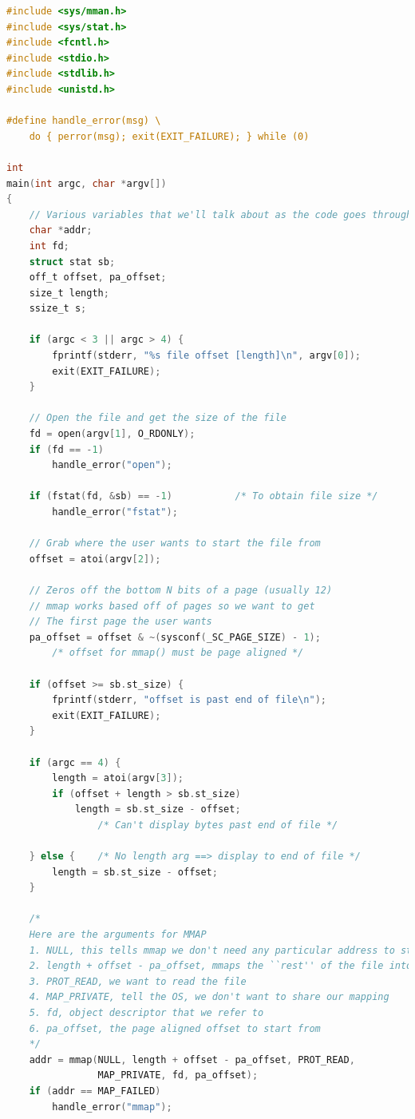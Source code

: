  \begin{lstlisting}[language=C]
#include <sys/mman.h>
#include <sys/stat.h>
#include <fcntl.h>
#include <stdio.h>
#include <stdlib.h>
#include <unistd.h>

#define handle_error(msg) \
    do { perror(msg); exit(EXIT_FAILURE); } while (0)

int
main(int argc, char *argv[])
{
    // Various variables that we'll talk about as the code goes through
    char *addr;
    int fd;
    struct stat sb;
    off_t offset, pa_offset;
    size_t length;
    ssize_t s;

    if (argc < 3 || argc > 4) {
        fprintf(stderr, "%s file offset [length]\n", argv[0]);
        exit(EXIT_FAILURE);
    }

    // Open the file and get the size of the file
    fd = open(argv[1], O_RDONLY);
    if (fd == -1)
        handle_error("open");

    if (fstat(fd, &sb) == -1)           /* To obtain file size */
        handle_error("fstat");

    // Grab where the user wants to start the file from
    offset = atoi(argv[2]);

    // Zeros off the bottom N bits of a page (usually 12)
    // mmap works based off of pages so we want to get
    // The first page the user wants
    pa_offset = offset & ~(sysconf(_SC_PAGE_SIZE) - 1);
        /* offset for mmap() must be page aligned */

    if (offset >= sb.st_size) {
        fprintf(stderr, "offset is past end of file\n");
        exit(EXIT_FAILURE);
    }

    if (argc == 4) {
        length = atoi(argv[3]);
        if (offset + length > sb.st_size)
            length = sb.st_size - offset;
                /* Can't display bytes past end of file */

    } else {    /* No length arg ==> display to end of file */
        length = sb.st_size - offset;
    }

    /*
    Here are the arguments for MMAP
    1. NULL, this tells mmap we don't need any particular address to start from
    2. length + offset - pa_offset, mmaps the ``rest'' of the file into memory (starting form offset)
    3. PROT_READ, we want to read the file
    4. MAP_PRIVATE, tell the OS, we don't want to share our mapping
    5. fd, object descriptor that we refer to
    6. pa_offset, the page aligned offset to start from
    */
    addr = mmap(NULL, length + offset - pa_offset, PROT_READ,
                MAP_PRIVATE, fd, pa_offset);
    if (addr == MAP_FAILED)
        handle_error("mmap");


\end{lstlisting}
